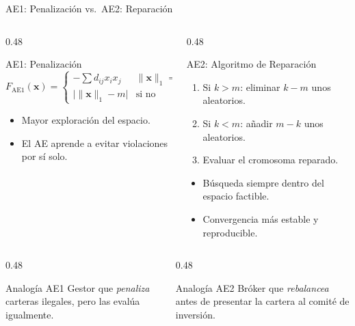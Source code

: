 \documentclass[aspectratio=169]{beamer}
\begin{document}
\begin{frame}{AE1: Penalización vs.\ AE2: Reparación}
  \begin{columns}[T]
    \begin{column}{0.48\textwidth}
      \begin{block}{AE1: Penalización}
        \[
          F_{\text{AE1}}(\mathbf{x}) =
          \begin{cases}
            -\sum d_{ij}x_ix_j & \|\mathbf{x}\|_1 = m\\
            \bigl|\|\mathbf{x}\|_1 - m\bigr| & \text{si no}
          \end{cases}
        \]
        \begin{itemize}
          \item Mayor exploración del espacio.
          \item El AE aprende a evitar violaciones por sí solo.
        \end{itemize}
      \end{block}
    \end{column}
    \begin{column}{0.48\textwidth}
      \begin{block}{AE2: Algoritmo de Reparación}
        \begin{enumerate}
          \item Si $k > m$: eliminar $k-m$ unos aleatorios.
          \item Si $k < m$: añadir $m-k$ unos aleatorios.
          \item Evaluar el cromosoma reparado.
        \end{enumerate}
        \begin{itemize}
          \item Búsqueda siempre dentro del espacio factible.
          \item Convergencia más estable y reproducible.
        \end{itemize}
      \end{block}
    \end{column}
  \end{columns}

  \vspace{8pt}
  \begin{columns}[T]
    \begin{column}{0.48\textwidth}
      \begin{alertblock}{Analogía AE1}
        Gestor que \emph{penaliza} carteras ilegales,
        pero las evalúa igualmente.
      \end{alertblock}
    \end{column}
    \begin{column}{0.48\textwidth}
      \begin{alertblock}{Analogía AE2}
        Bróker que \emph{rebalancea} antes de presentar
        la cartera al comité de inversión.
      \end{alertblock}
    \end{column}
  \end{columns}
\end{frame}
\end{document}
